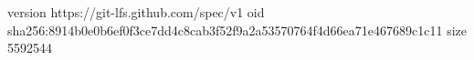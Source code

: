 version https://git-lfs.github.com/spec/v1
oid sha256:8914b0e0b6ef0f3ce7dd4c8cab3f52f9a2a53570764f4d66ea71e467689c1c11
size 5592544
